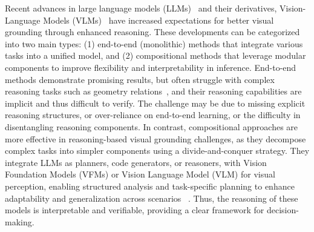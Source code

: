 
Recent advances in large language models (LLMs)~\cite{chowdhery_palm_2023,bai_constitutional_2022,ouyang_training_2022,radford_language_2019} and their derivatives,
Vision-Language Models (VLMs)~\cite{li_otter_2023,wu_next-gpt_2023,stanic_towards_2024,zhu_minigpt-4_2023} have increased expectations for better visual grounding through enhanced reasoning. These developments can be categorized into two main types: (1) end-to-end (monolithic) methods that integrate various tasks into a unified model, and (2) compositional methods that leverage modular components to improve flexibility and interpretability in inference.
End-to-end methods demonstrate promising results, but often struggle with complex reasoning tasks such as geometry relations~\cite{chen_unigeo_2022}, and their reasoning capabilities are implicit and thus difficult to verify. The challenge may be due to missing explicit reasoning structures, or over-reliance on end-to-end learning, or the difficulty in disentangling reasoning components.
In contrast, compositional approaches are more effective in reasoning-based visual grounding challenges, as they decompose complex tasks into simpler components using a divide-and-conquer strategy.
They integrate LLMs as planners, code generators, or reasoners, with Vision Foundation Models (VFMs) or Vision Language Model (VLM) for visual perception, enabling structured analysis and task-specific planning to enhance adaptability and generalization across scenarios ~\cite{gupta_visual_2023, suris_vipergpt_2023, lu_chameleon_2023, wu_visual_2023}. Thus, the reasoning of these models is interpretable and verifiable, providing a clear framework for decision-making.
